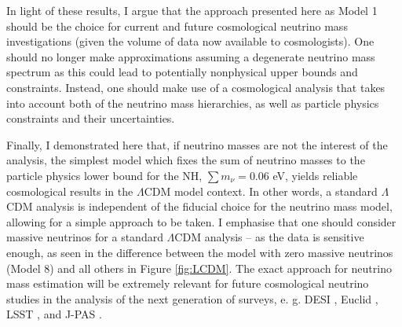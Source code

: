 \qquad In light of these results, I argue that the approach presented here as Model 1 should be the choice for current and future cosmological neutrino mass investigations (given the volume of data now available to cosmologists). One should no longer make approximations assuming a degenerate neutrino mass spectrum as this could lead to potentially nonphysical upper bounds and constraints. Instead, one should make use of a cosmological analysis that takes into account both of the neutrino mass hierarchies, as well as particle physics constraints and their uncertainties. 

\qquad Finally, I demonstrated here that, if neutrino masses are not the interest of the analysis, the simplest model which fixes the sum of neutrino masses to the particle physics lower bound for the NH, $\sum m_{\nu} = 0.06$ eV, yields reliable cosmological results in the $\Lambda$CDM model context. In other words, a standard $\Lambda$CDM analysis is independent of the fiducial choice for the neutrino mass model, allowing for a simple approach to be taken. I emphasise that one should consider massive neutrinos for a standard $\Lambda$CDM analysis -- as the data is sensitive enough, as seen in the difference between the model with zero massive neutrinos (Model 8) and all others in Figure \ref{fig:LCDM}. The exact approach for neutrino mass estimation will be extremely relevant for future cosmological neutrino studies in the analysis of the next generation of surveys, e. g. DESI \citep{2016-DESI}, Euclid \citep{2011EuclidRedPaper}, LSST \citep{LSST}, and J-PAS \citep{JPAS}.


